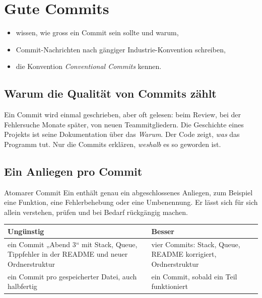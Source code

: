 \chapter{Gute Commits}
\label{kap:commits}

\begin{lernziele}
\begin{itemize}[nosep]
  \item wissen, wie gross ein Commit sein sollte und warum,
  \item Commit-Nachrichten nach gängiger Industrie-Konvention schreiben,
  \item die Konvention \emph{Conventional Commits} kennen.
\end{itemize}
\end{lernziele}

\section{Warum die Qualität von Commits zählt}

Ein Commit wird einmal geschrieben, aber oft gelesen: beim Review, bei der Fehlersuche
Monate später, von neuen Teammitgliedern. Die Geschichte eines Projekts ist seine
Dokumentation über das \emph{Warum}. Der Code zeigt, \emph{was} das Programm tut. Nur die
Commits erklären, \emph{weshalb} es so geworden ist.

\section{Ein Anliegen pro Commit}

\begin{definition}{Atomarer Commit}
Ein  enthält genau ein abgeschlossenes Anliegen, zum Beispiel eine
Funktion, eine Fehlerbehebung oder eine Umbenennung. Er lässt sich für sich allein
verstehen, prüfen und bei Bedarf rückgängig machen.
\end{definition}

\begin{center}
\renewcommand{\arraystretch}{1.3}
\begin{tabularx}{\linewidth}{@{}>{\raggedright\arraybackslash}X>{\raggedright\arraybackslash}X@{}}
  \toprule
  \textbf{Ungünstig} & \textbf{Besser} \\
  \midrule
  ein Commit „Abend 3“ mit Stack, Queue, Tippfehler in der README und neuer Ordnerstruktur
  & vier Commits: Stack, Queue, README korrigiert, Ordnerstruktur \\
  ein Commit pro gespeicherter Datei, auch halbfertig
  & ein Commit, sobald ein Teil funktioniert \\
  \bottomrule
\end{tabularx}
\end{center}

